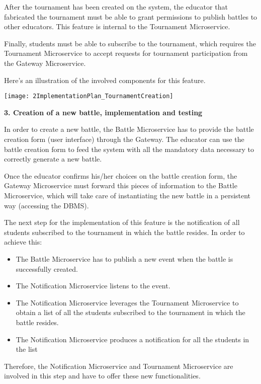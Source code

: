 After the tournament has been created on the system, the educator that fabricated the tournament must be able to grant permissions to publish battles to other educators. This feature is internal to the Tournament Microservice.

Finally, students must be able to subscribe to the tournament, which requires the Tournament Microservice to accept requests for tournament participation from the Gateway Microservice.

Here's an illustration of the involved components for this feature.



\begin{center}
	\texttt{[image: 2ImplementationPlan\_TournamentCreation]}
\end{center}


\textbf{3. Creation of a new battle, implementation and testing}

In order to create a new battle, the Battle Microservice has to provide the battle creation form (user interface) through the Gateway. The educator can use the battle creation form to feed the system with all the mandatory data necessary to correctly generate a new battle.

Once the educator confirms his/her choices on the battle creation form, the Gateway Microservice must forward this pieces of information to the Battle Microservice, which will take care of instantiating the new battle in a persistent way (accessing the DBMS).

The next step for the implementation of this feature is the notification of all students subscribed to the tournament in which the battle resides. In order to achieve this:
\begin{itemize}
	\item The Battle Microservice has to publish a new event when the battle is successfully created.
	\item The Notification Microservice listens to the event.
	\item The Notification Microservice leverages the Tournament Microservice to obtain a list of all the students subscribed to the tournament in which the battle resides.
	\item The Notification Microservice produces a notification for all the students in the list
\end{itemize}

Therefore, the Notification Microservice and Tournament Microservice are involved in this step and have to offer these new functionalities.

